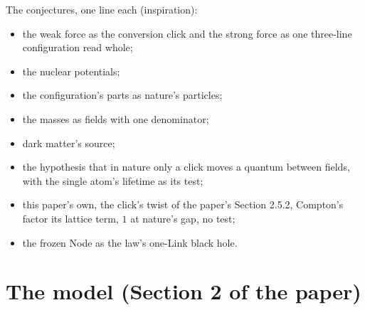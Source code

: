 \documentclass[pdflatex,sn-mathphys-num]{sn-jnl}
\theoremstyle{thmstyleone}
\begin{document}
The conjectures, one line each (inspiration):
\begin{itemize}
\item the weak force as the conversion click and the strong force as one three-line configuration read whole;
\item the nuclear potentials;
\item the configuration's parts as nature's particles;
\item the masses as fields with one denominator;
\item dark matter's source;
\item the hypothesis that in nature only a click moves a quantum between fields, with the single atom's lifetime as its test;
\item this paper's own, the click's twist of the paper's Section 2.5.2, Compton's factor its lattice term, $1$ at nature's gap, no test;
\item the frozen Node as the law's one-Link black hole.
\end{itemize}

\section*{The model (Section 2 of the paper)}
\end{document}
